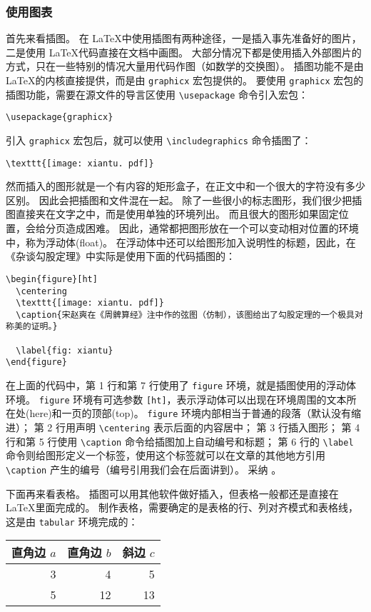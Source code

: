 \documentclass[UTF8]{ctexart} %
\newcommand{\cmark}{\ding{51}} %
\begin{document}
\subsubsection{使用图表}
\label{subsub:使用图表}

首先来看插图。
在 \LaTeX 中使用插图有两种途径，一是插入事先准备好的图片，二是使用 \LaTeX 代码直接在文档中画图。
大部分情况下都是使用插入外部图片的方式，只在一些特别的情况大量用代码作图（如数学的交换图）。
插图功能不是由 \LaTeX 的内核直接提供，而是由 \verb|graphicx| 宏包提供的。
要使用 \verb|graphicx| 宏包的插图功能，需要在源文件的导言区使用 \verb|\usepackage| 命令引入宏包：
\begin{verbatim}
\usepackage{graphicx}
\end{verbatim}
引入 \verb|graphicx| 宏包后，就可以使用 \verb|\includegraphics| 命令插图了：
\begin{verbatim}
\texttt{[image: xiantu. pdf]}
\end{verbatim}
然而插入的图形就是一个有内容的矩形盒子，在正文中和一个很大的字符没有多少区别。
因此会把插图和文件混在一起。
除了一些很小的标志图形，我们很少把插图直接夹在文字之中，而是使用单独的环境列出。
而且很大的图形如果固定位置，会给分页造成困难。
因此，通常都把图形放在一个可以变动相对位置的环境中，称为浮动体(float)。
在浮动体中还可以给图形加入说明性的标题，因此，在《杂谈勾股定理》中实际是使用下面的代码插图的：
\begin{verbatim}
\begin{figure}[ht]
  \centering
  \texttt{[image: xiantu. pdf]}
  \caption{宋赵爽在《周髀算经》注中作的弦图（仿制），该图给出了勾股定理的一个极具对称美的证明。}
  
  \label{fig: xiantu}
\end{figure}
\end{verbatim}
在上面的代码中，第 1 行和第 7 行使用了 \verb|figure| 环境，就是插图使用的浮动体环境。
\verb|figure| 环境有可选参数 \verb|[ht]|，表示浮动体可以出现在环境周围的文本所在处(here)和一页的顶部(top)。
\verb|figure| 环境内部相当于普通的段落（默认没有缩进）；
第 2 行用声明 \verb|\centering| 表示后面的内容居中；
第 3 行插入图形；
第 4 行和第 5 行使用 \verb|\caption| 命令给插图加上自动编号和标题；
第 6 行的 \verb|\label| 命令则给图形定义一个标签，使用这个标签就可以在文章的其他地方引用 \verb|\caption| 产生的编号（编号引用我们会在后面讲到）。
采纳 \cmark。

下面再来看表格。
插图可以用其他软件做好插入，但表格一般都还是直接在 \LaTeX 里面完成的。
制作表格，需要确定的是表格的行、列对齐模式和表格线，这是由 \verb|tabular| 环境完成的：
\begin{tabular}{|rrr|}
\hline
直角边 $a$ &直角边 $b$ &斜边 $c$ \\
\hline
3&4&5\\
5&12&13\\
\hline
\end{tabular}
\end{document}
